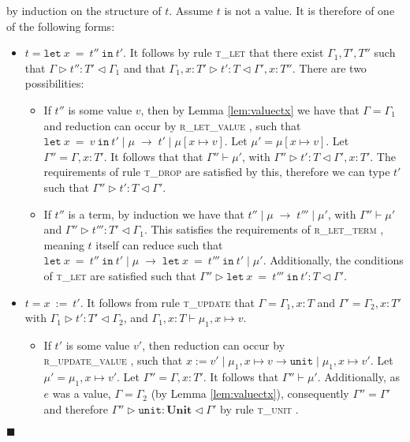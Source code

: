 \documentclass{article}
\newcommand{\lemref}[1]{Lemma \ref{#1}}
\newcommand{\rlett}{\textsc{r\_let\_term} }
\newcommand{\rletv}{\textsc{r\_let\_value} }
\newcommand{\rupdv}{\textsc{r\_update\_value} }
\newcommand{\tunit}{\textsc{t\_unit} }
\newcommand{\tlet}{\textsc{t\_let} }
\newcommand{\tupd}{\textsc{t\_update} }
\newcommand{\tdrop}{\textsc{t\_drop} }
\newcommand{\typerule}[4]{#1 \triangleright #2 : #3 \triangleleft #4}
\newcommand{\oprule}[4]{#1 \mid #2\;\longrightarrow\;#3 \mid #4}
\newcommand{\unitv}{\mathtt{unit}}
\newcommand{\unitt}{\mathbf{Unit}}
\newcommand{\lett}[3]{\mathtt{let}\:#1\:\mathtt{=}\:#2\:\mathtt{in}\:#3}
\newcommand{\upt}[2]{#1\:\mathtt{:=}\:#2}
\newcommand{\qed}{$\blacksquare$}
\newenvironment{proof}{\vspace{1ex}\noindent{\bf Proof}\hspace{0.5em}}
  {\hfill\qed\vspace{1ex}}
\begin{document}
\begin{proof}
by induction on the structure of $t$. Assume $t$ is not a value. It is
therefore of one of the following forms:

\begin{itemize}
\item $t = \lett{x}{t''}{t'}$. 
It follows by rule \tlet that there exist $\Gamma_1, T', T''$
such that
$\typerule{\Gamma}{t''}{T'}{\Gamma_1}$ and that
$\typerule{\Gamma_1, x : T'}{t'}{T}{\Gamma', x : T''}$. There are two
possibilities:

	\begin{itemize}
	\item If $t''$ is some value $v$, then by \lemref{lem:valuectx} 
	we have that $\Gamma = \Gamma_1$ and reduction can occur
	by \rletv, such that 
	$\oprule{\lett{x}{v}{t'}}{\mu}{t'}{\mu [ x \mapsto v ]}$.
	Let $\mu' = \mu [ x \mapsto v ]$. Let $\Gamma'' = \Gamma, x : T'$.
	It follows that that $\Gamma'' \vdash \mu'$, with
	$\typerule{\Gamma''}{t'}{T}{\Gamma', x : T'}$.
	The requirements of rule \tdrop are satisfied by this, therefore we can 
	type $t'$ such that $\typerule{\Gamma''}{t'}{T}{\Gamma'}$.

	\item If $t''$ is a term, 
	by induction we have that $\oprule{t''}{\mu}{t'''}{\mu'}$, with
	$\Gamma'' \vdash \mu'$ and $\typerule{\Gamma''}{t'''}{T'}{\Gamma_1}$.
	This satisfies the requirements of \rlett, meaning $t$ itself can reduce
	such that $\oprule{\lett{x}{t''}{t'}}{\mu}{\lett{x}{t'''}{t'}}{\mu'}$.
	Additionally, the conditions of \tlet are satisfied such that
	$\typerule{\Gamma''}{\lett{x}{t'''}{t'}}{T}{\Gamma'}$.

	\end{itemize}

\item $t = \upt{x}{t'}$. It follows from rule \tupd that $\Gamma = \Gamma_1, x : T$ 
and $\Gamma' = \Gamma_2, x : T'$ with $\typerule{\Gamma_1}{t'}{T'}{\Gamma_2}$,
and $\Gamma_1, x : T \vdash \mu_1, x \mapsto v$.

	\begin{itemize}
	\item If $t'$ is some value $v'$, 
	then reduction can occur by \\
	\rupdv, such that 
	$x := v' \mid \mu_1, x \mapsto v \longrightarrow \unitv \mid \mu_1 , x \mapsto v'$.
	Let $\mu' = \mu_1, x \mapsto v'$. Let $\Gamma'' = \Gamma, x : T'$.
	It follows that $\Gamma'' \vdash \mu'$. Additionally, as $e$ was a value,
	$\Gamma = \Gamma_2$ (by \lemref{lem:valuectx}), consequently 
	$\Gamma'' = \Gamma'$ and therefore
	$\typerule{\Gamma''}{\unitv}{\unitt}{\Gamma'}$ by rule
	\tunit.


\end{itemize}
\end{itemize}
\end{proof}
\end{document}
